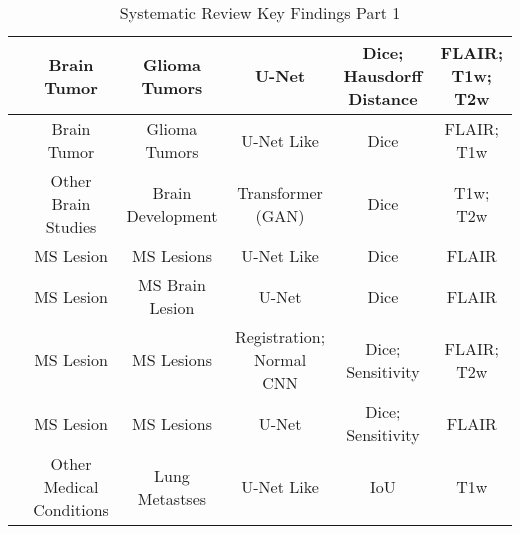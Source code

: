 \begin{landscape}
\begin{table}[H]
{\begin{tabular}{|c|c|c|c|c|c|}
\hline
\cite{2212} & Brain Tumor & Glioma Tumors & U-Net & Dice; Hausdorff Distance & FLAIR; T1w; T2w \\
\hline
\cite{2198} & Brain Tumor & Glioma Tumors & U-Net Like & Dice & FLAIR; T1w \\
\hline
\cite{2177} & Other Brain Studies & Brain Development & Transformer (GAN) & Dice & T1w; T2w \\
\hline
\cite{2159} & MS Lesion & MS Lesions & U-Net Like & Dice & FLAIR \\
\hline
\cite{2158} & MS Lesion & MS Brain Lesion & U-Net & Dice & FLAIR \\
\hline
\cite{2125} & MS Lesion & MS Lesions & Registration; Normal CNN & Dice; Sensitivity & FLAIR; T2w \\
\hline
\cite{2115} & MS Lesion & MS Lesions & U-Net & Dice; Sensitivity & FLAIR \\
\hline
\cite{2108} & Other Medical Conditions & Lung Metastses & U-Net Like & IoU & T1w \\
\hline

\end{tabular}
}
\caption{Systematic Review Key Findings Part 1}
\label{table:study_info_part1}
\end{table}
\end{landscape}

